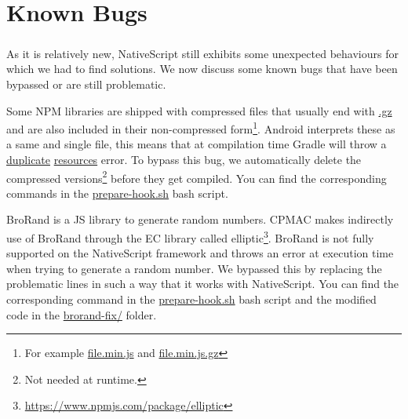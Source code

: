 \chapter{Known Bugs}

\paragraph{}
As it is relatively new, NativeScript still exhibits some unexpected behaviours for which we had to find solutions. We now discuss some known bugs that have been bypassed or are still problematic.

\begin{description}[style=nextline]
\item[Compressed Files (Android)] Some NPM libraries are shipped with compressed files that usually end with \url{.gz} and are also included in their non-compressed form\footnote{For example \url{file.min.js} and \url{file.min.js.gz}}. Android interprets these as a same and single file, this means that at compilation time Gradle will throw a \url{duplicate} \url{resources} error. To bypass this bug, we automatically delete the compressed versions\footnote{Not needed at runtime.} before they get compiled. You can find the corresponding commands in the \url{prepare-hook.sh} bash script.

\item[The BroRand Library\footnote{\url{https://www.npmjs.com/package/brorand}}] BroRand is a JS library to generate random numbers. CPMAC makes indirectly use of BroRand through the EC library called elliptic\footnote{\url{https://www.npmjs.com/package/elliptic}}. BroRand is not fully supported on the NativeScript framework and throws an error at execution time when trying to generate a random number. We bypassed this by replacing the problematic lines in such a way that it works with NativeScript. You can find the corresponding command in the \url{prepare-hook.sh} bash script and the modified code in the \url{brorand-fix/} folder.


\end{description}
